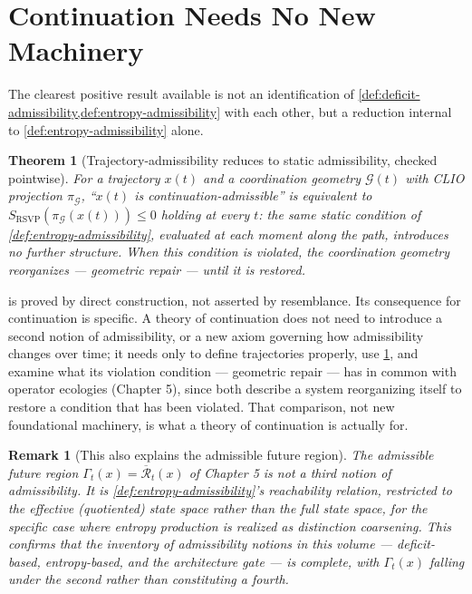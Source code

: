 \documentclass[12pt]{report}
\newtheorem{theorem}[definition]{Theorem}
\newtheorem{remark}[definition]{Remark}
\begin{document}
\section{Continuation Needs No New Machinery}
\label{sec:continuation-reduction}

The clearest positive result available is not an identification of
\cref{def:deficit-admissibility,def:entropy-admissibility} with each
other, but a reduction internal to \cref{def:entropy-admissibility}
alone.

\begin{theorem}[Trajectory-admissibility reduces to static admissibility, checked pointwise]
\label{thm:pointwise-reduction}
For a trajectory $x(t)$ and a coordination geometry $\mathcal{G}(t)$ with
CLIO projection $\pi_\mathcal{G}$, ``$x(t)$ is continuation-admissible''
is equivalent to $S_{\mathrm{RSVP}}(\pi_\mathcal{G}(x(t))) \leq 0$ holding
at every $t$: the same static condition of \cref{def:entropy-admissibility},
evaluated at each moment along the path, introduces no further
structure. When this condition is violated, the coordination geometry
reorganizes --- geometric repair --- until it is restored.
\end{theorem}

 is proved by direct construction, not
asserted by resemblance. Its consequence for continuation is specific.
A theory of continuation does not need to introduce a second notion of
admissibility, or a new axiom governing how admissibility changes over
time; it needs only to define trajectories properly, use
\cref{thm:pointwise-reduction}, and examine what its violation condition
--- geometric repair --- has in common with operator ecologies (Chapter
5), since both describe a system reorganizing itself to restore a
condition that has been violated. That comparison, not new foundational
machinery, is what a theory of continuation is actually for.

\begin{remark}[This also explains the admissible future region]
\label{rem:gamma-explained}
The admissible future region $\Gamma_t(x) = \overline{\mathcal{R}}_t(x)$
of Chapter 5 is not a third notion of admissibility. It is
\cref{def:entropy-admissibility}'s reachability relation, restricted to
the effective (quotiented) state space rather than the full state space,
for the specific case where entropy production is realized as
distinction coarsening. This confirms that the inventory of
admissibility notions in this volume --- deficit-based, entropy-based,
and the architecture gate --- is complete, with $\Gamma_t(x)$ falling
under the second rather than constituting a fourth.
\end{remark}
\end{document}
